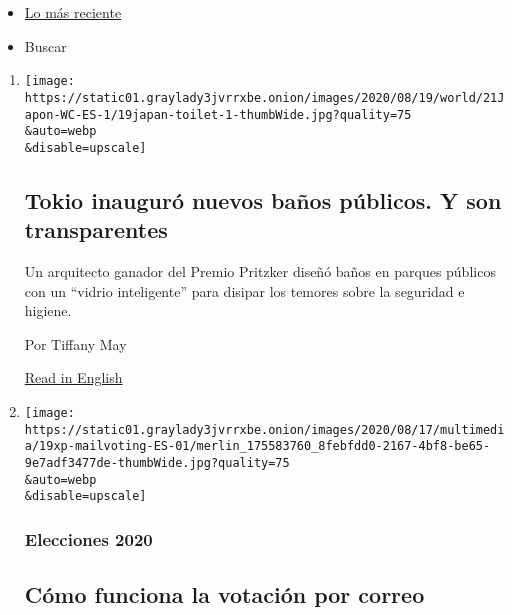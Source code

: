 \begin{itemize}
\tightlist
\item
  \protect\hyperlink{stream-panel}{Lo más reciente}
\item
  Buscar
\end{itemize}

\begin{enumerate}
\def\labelenumi{\arabic{enumi}.}
\item
  \href{/es/2020/08/21/espanol/mundo/banos-transparentes-japon.html}{}

  \texttt{[image: https://static01.graylady3jvrrxbe.onion/images/2020/08/19/world/21Japon-WC-ES-1/19japan-toilet-1-thumbWide.jpg?quality=75\\\&auto=webp\\\&disable=upscale]}

  \hypertarget{tokio-inauguruxf3-nuevos-bauxf1os-puxfablicos-y-son-transparentes}{%
  \subsection{Tokio inauguró nuevos baños públicos. Y son
  transparentes}\label{tokio-inauguruxf3-nuevos-bauxf1os-puxfablicos-y-son-transparentes}}

  Un arquitecto ganador del Premio Pritzker diseñó baños en parques
  públicos con un ``vidrio inteligente'' para disipar los temores sobre
  la seguridad e higiene.

  Por Tiffany May

  \href{https://www.nytimes3xbfgragh.onion/2020/08/19/world/asia/japan-transparent-toilets.html}{Read
  in English}
\item
  \href{/es/article/voto-por-correo.html}{}

  \texttt{[image: https://static01.graylady3jvrrxbe.onion/images/2020/08/17/multimedia/19xp-mailvoting-ES-01/merlin\_175583760\_8febfdd0-2167-4bf8-be65-9e7adf3477de-thumbWide.jpg?quality=75\\\&auto=webp\\\&disable=upscale]}

  \hypertarget{elecciones-2020-3}{%
  \subsubsection{Elecciones 2020}\label{elecciones-2020-3}}

  \hypertarget{cuxf3mo-funciona-la-votaciuxf3n-por-correo}{%
  \subsection{Cómo funciona la votación por
  correo}\label{cuxf3mo-funciona-la-votaciuxf3n-por-correo}}


\end{enumerate}
